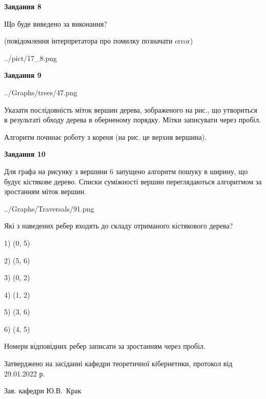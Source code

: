 \documentclass[12pt, ukrainian]{article}
\begin{document}
{\begin {large}
{\begin {center}\textbf{Завдання 8}\end {center}}\par
Що буде виведено за виконання?\par
 (повідомлення інтерпретатора про помилку позначати error)\par
\begin{center}
	{../pict/17_8.png}
\end{center}
\newpage

{\begin {center}\textbf{Завдання 9}\end {center}}\par

\begin{center}
	{../Graphs/trees/47.png}
\end{center}
Указати послідовність міток вершин дерева, зображеного на рис., що утвориться в результаті обходу дерева в оберненому порядку. Мітки записувати через пробіл.\par Алгоритм починає роботу з кореня (на рис. це верхня вершина).\par
\newpage

{\begin {center}\textbf{Завдання 10}\end {center}}\par
Для графа на рисунку з вершини 6 запущено алгоритм пошуку в ширину, що будує кістякове дерево. Списки суміжності вершин переглядаються алгоритмом за зростанням міток вершин.\par
\begin{center}
	{../Graphs/Traversals/91.png}
\end{center}
\par Які з наведених ребер входять до складу отриманого кістякового дерева?\par
1) (0, 5)\par
2) (5, 6)\par
3) (0, 2)\par
4) (1, 2)\par
5) (3, 6)\par
6) (4, 5)\par
{\vskip 15pt} Номери відповідних ребер записати за зростанням через пробіл.\par
\newpage


\end {large}
}
{\smallskip \begin {small} Затверджено на засіданні кафедри теоретичної кібернетики, протокол  від   29.01.2022 р.\par\smallskip\smallskip
{\parbox {6.5 cm}{Зав. кафедри \dotfill Ю.В.~Крак}} \end{small}}
\end{document}
